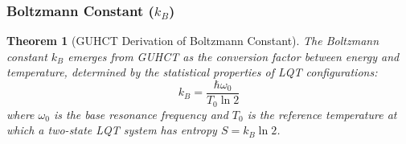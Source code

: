 \documentclass[11pt,a4paper]{article}
\newtheorem{theorem}{Theorem}[section]
\begin{document}
\subsubsection{Boltzmann Constant ($k_B$)}
\label{ssubsec:boltzmann_constant}

\begin{theorem}[GUHCT Derivation of Boltzmann Constant]
\label{thm:boltzmann_constant}
The Boltzmann constant $k_B$ emerges from GUHCT as the conversion factor between energy and temperature, determined by the statistical properties of LQT configurations:
\begin{equation}
k_B = \frac{\hbar \omega_0}{T_0 \ln 2}
\label{eq:kB_def} %
\end{equation}
where $\omega_0$ is the base resonance frequency and $T_0$ is the reference temperature at which a two-state LQT system has entropy $S = k_B \ln 2$.
\end{theorem}
\end{document}
